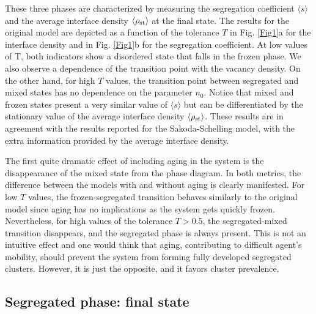 These three phases are characterized by measuring the segregation coefficient $\langle s \rangle$ and the average interface density $\langle\rho_{\rm{st}} \rangle$ at the final state. The results for the original model are depicted as a function of the tolerance $T$ in Fig. \ref{Fig1}a for the interface density and in Fig. \ref{Fig1}b for the segregation coefficient. At low values of T, both indicators show a disordered state that falls in the frozen phase.  We also observe a dependence of the transition point with the vacancy density. On the other hand, for high $T$ values, the transition point between segregated and mixed states has no dependence on the parameter $n_0$. Notice that mixed and frozen states present a very similar value of $\langle s \rangle$ but can be differentiated by the stationary value of the average interface density $\langle\rho_{\rm{st}} \rangle$. These results are in agreement with the results reported for the Sakoda-Schelling model\cite{Gauvin_2009}, with the extra information provided by the average interface density.

The first quite dramatic effect of including aging in the system is the disappearance of the mixed state from the phase diagram. In both metrics, the difference between the models with and without aging is clearly manifested. For low $T$ values, the frozen-segregated transition behaves similarly to the original model since aging has no implications as the system gets quickly frozen. Nevertheless, for high values of the tolerance $T> 0.5$, the segregated-mixed transition disappears, and the segregated phase is always present. This is not an intuitive effect and one would think that aging, contributing to difficult agent's mobility, should prevent the system from forming fully developed segregated clusters. However, it is just the opposite, and it favors cluster prevalence.

\subsection{Segregated phase: final state}

